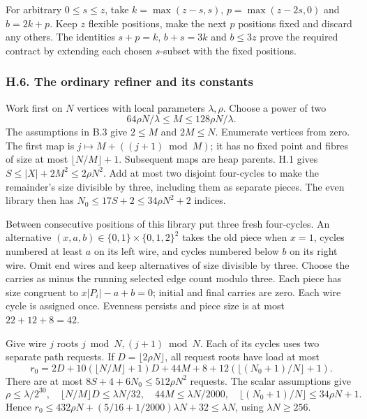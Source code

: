 \documentclass[english,11pt,a4paper]{article}
\begin{document}
For arbitrary \(0\le s\le z\), take \(k=\max(z-s,s)\), \(p=\max(z-2s,0)\) and \(b=2k+p\). Keep \(z\) flexible positions, make the next \(p\) positions fixed and discard any others. The identities \(s+p=k\), \(b+s=3k\) and \(b\le3z\) prove the required contract by extending each chosen \(s\)-subset with the fixed positions.

\subsubsection{H.6. The ordinary refiner and its constants}\label{h.6.-the-ordinary-refiner-and-its-constants}

Work first on \(N\) vertices with local parameters \(\lambda,\rho\). Choose a power of two \[64\rho N/\lambda\le M\le128\rho N/\lambda.\] The assumptions in B.3 give \(2\le M\) and \(2M\le N\). Enumerate vertices from zero. The first map is \(j\mapsto M+((j+1)\bmod M)\); it has no fixed point and fibres of size at most \(\lfloor N/M\rfloor+1\). Subsequent maps are heap parents. H.1 gives \(S\le|X|+2M^2\le2\rho N^2\). Add at most two disjoint four-cycles to make the remainder's size divisible by three, including them as separate pieces. The even library then has \(N_0\le17S+2\le34\rho N^2+2\) indices.

Between consecutive positions of this library put three fresh four-cycles. An alternative \((x,a,b)\in\{0,1\}\times\{0,1,2\}^2\) takes the old piece when \(x=1\), cycles numbered at least \(a\) on its left wire, and cycles numbered below \(b\) on its right wire. Omit end wires and keep alternatives of size divisible by three. Choose the carries as minus the running selected edge count modulo three. Each piece has size congruent to \(x|P_i|-a+b=0\); initial and final carries are zero. Each wire cycle is assigned once. Evenness persists and piece size is at most \(22+12+8=42\).

Give wire \(j\) roots \(j\bmod N,(j+1)\bmod N\). Each of its cycles uses two separate path requests. If \(D=\lfloor2\rho N\rfloor\), all request roots have load at most \[r_0=2D+10(\lfloor N/M\rfloor+1)D+44M+8
+12(\lfloor(N_0+1)/N\rfloor+1).\] There are at most \(8S+4+6N_0\le512\rho N^2\) requests. The scalar assumptions give \[\rho\le\lambda/2^{30},\quad
\lfloor N/M\rfloor D\le\lambda N/32,\quad
44M\le\lambda N/2000,\quad
\lfloor(N_0+1)/N\rfloor\le34\rho N+1.\] Hence \(r_0\le432\rho N+(5/16+1/2000)\lambda N+32\le\lambda N\), using \(\lambda N\ge256\).
\end{document}
